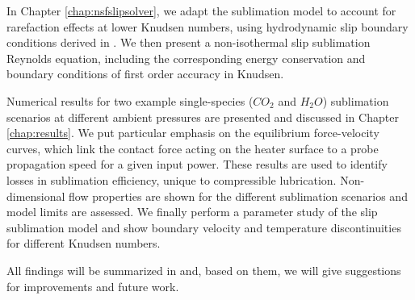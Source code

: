 In Chapter \ref{chap:nsfslipsolver}, we adapt the sublimation model to account for rarefaction effects at lower Knudsen numbers, using hydrodynamic slip boundary conditions derived in \cite{beckmann2018evaporation}. We then present a non-isothermal slip sublimation Reynolds equation, including the corresponding energy conservation and boundary conditions of first order accuracy in Knudsen.

Numerical results for two example single-species ($\textit{CO}_2$ and $\textit{H}_2\textit{O}$) sublimation scenarios at different ambient pressures are presented and discussed in Chapter \ref{chap:results}. 
We put particular emphasis on the equilibrium force-velocity curves, which link the contact force acting on the heater surface to a probe propagation speed for a given input power. These results are used to identify losses in sublimation efficiency, unique to compressible lubrication. Non-dimensional flow properties are shown for the different sublimation scenarios and model limits are assessed. We finally perform a parameter study of the slip sublimation model and show boundary velocity and temperature discontinuities for different Knudsen numbers.

All findings will be summarized in  and, based on them, we will give suggestions for improvements and future work. 